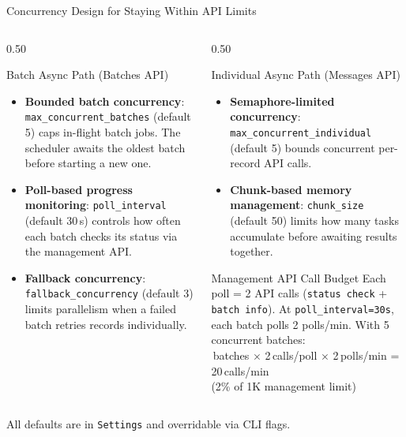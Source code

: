 \documentclass[
        11pt,
        compress,
        xcolor={dvipsnames}
    ]{beamer}
\begin{document}
\begin{frame}{Concurrency Design for Staying Within API Limits}
  \begin{columns}[T]
    \begin{column}{0.50\textwidth}
      \begin{block}{Batch Async Path (Batches API)}
        \scriptsize
        \begin{itemize}\setlength{\itemsep}{0.3em}
          \item \textbf{Bounded batch concurrency}:
            \texttt{max\_concurrent\_batches} (default 5) caps in-flight batch jobs.
            The scheduler awaits the oldest batch before starting a new one.
          \item \textbf{Poll-based progress monitoring}:
            \texttt{poll\_interval} (default 30\,s) controls how often each batch checks its status via the management API.
          \item \textbf{Fallback concurrency}:
            \texttt{fallback\_concurrency} (default 3) limits parallelism when a failed batch retries records individually.
        \end{itemize}
      \end{block}
    \end{column}
    \begin{column}{0.50\textwidth}
      \begin{block}{Individual Async Path (Messages API)}
        \scriptsize
        \begin{itemize}\setlength{\itemsep}{0.3em}
          \item \textbf{Semaphore-limited concurrency}:
            \texttt{max\_concurrent\_individual} (default 5) bounds concurrent per-record API calls.
          \item \textbf{Chunk-based memory management}:
            \texttt{chunk\_size} (default 50) limits how many tasks accumulate before awaiting results together.
        \end{itemize}
      \end{block}
      \vspace{0.2em}
      \begin{block}{Management API Call Budget}
        \ttfamily\tiny
        Each poll = 2 API calls (\texttt{status check} + \texttt{batch info}).
        At \texttt{poll\_interval=30s}, each batch polls 2 polls/min. With 5 concurrent batches:\\[0.3em]
        \,batches $\times$ 2\,calls/poll $\times$ 2\,polls/min = 20\,calls/min\\
        (2\% of 1K management limit)
      \end{block}
    \end{column}
  \end{columns}
  \centering
  \scriptsize
  All defaults are in \texttt{Settings} and overridable via CLI flags.
\end{frame}
\end{document}

